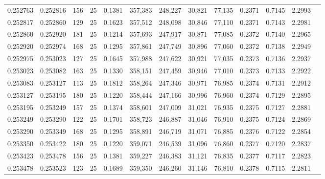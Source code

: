 \begin{tabular}{rrrrrrrrrrrrr}
0.252763 & 0.252816 &   156 &  25 &                                     0.1381 & 357,383 & 248,227 &  30,821 &  77,135 & 0.2371 & 0.7145 & 2.2993 \\
0.252817 & 0.252860 &   129 &  25 &                                     0.1623 & 357,512 & 248,098 &  30,846 &  77,110 & 0.2371 & 0.7143 & 2.2981 \\
0.252860 & 0.252920 &   181 &  25 &                                     0.1214 & 357,693 & 247,917 &  30,871 &  77,085 & 0.2372 & 0.7140 & 2.2965 \\
0.252920 & 0.252974 &   168 &  25 &                                     0.1295 & 357,861 & 247,749 &  30,896 &  77,060 & 0.2372 & 0.7138 & 2.2949 \\
0.252975 & 0.253023 &   127 &  25 &                                     0.1645 & 357,988 & 247,622 &  30,921 &  77,035 & 0.2373 & 0.7136 & 2.2937 \\
0.253023 & 0.253082 &   163 &  25 &                                     0.1330 & 358,151 & 247,459 &  30,946 &  77,010 & 0.2373 & 0.7133 & 2.2922 \\
0.253083 & 0.253127 &   113 &  25 &                                     0.1812 & 358,264 & 247,346 &  30,971 &  76,985 & 0.2374 & 0.7131 & 2.2912 \\
0.253127 & 0.253195 &   180 &  25 &                                     0.1220 & 358,444 & 247,166 &  30,996 &  76,960 & 0.2374 & 0.7129 & 2.2895 \\
0.253195 & 0.253249 &   157 &  25 &                                     0.1374 & 358,601 & 247,009 &  31,021 &  76,935 & 0.2375 & 0.7127 & 2.2881 \\
0.253249 & 0.253290 &   122 &  25 &                                     0.1701 & 358,723 & 246,887 &  31,046 &  76,910 & 0.2375 & 0.7124 & 2.2869 \\
0.253290 & 0.253349 &   168 &  25 &                                     0.1295 & 358,891 & 246,719 &  31,071 &  76,885 & 0.2376 & 0.7122 & 2.2854 \\
0.253350 & 0.253422 &   180 &  25 &                                     0.1220 & 359,071 & 246,539 &  31,096 &  76,860 & 0.2377 & 0.7120 & 2.2837 \\
0.253423 & 0.253478 &   156 &  25 &                                     0.1381 & 359,227 & 246,383 &  31,121 &  76,835 & 0.2377 & 0.7117 & 2.2823 \\
0.253478 & 0.253523 &   123 &  25 &                                     0.1689 & 359,350 & 246,260 &  31,146 &  76,810 & 0.2378 & 0.7115 & 2.2811 \\

\end{tabular}
